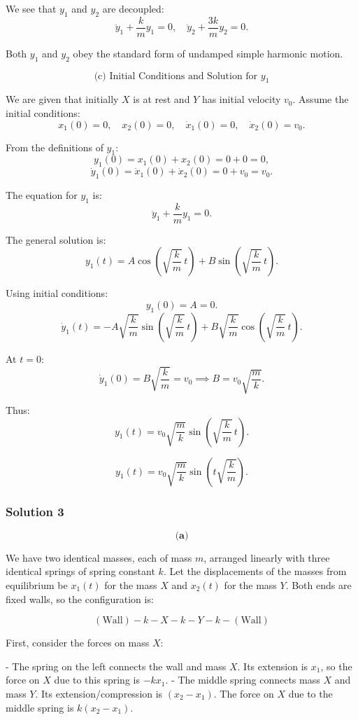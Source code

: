 \documentclass{article}
\begin{document}
We see that $y_1$ and $y_2$ are decoupled:
\[
\ddot{y}_1 + \frac{k}{m}y_1 = 0, \quad \ddot{y}_2 + \frac{3k}{m}y_2 = 0.
\]

Both $y_1$ and $y_2$ obey the standard form of undamped simple harmonic motion.

\[
\text{(c) Initial Conditions and Solution for } y_1
\]

We are given that initially $X$ is at rest and $Y$ has initial velocity $v_0$. Assume the initial conditions:
\[
x_1(0) = 0, \quad x_2(0) = 0, \quad \dot{x}_1(0)=0, \quad \dot{x}_2(0)=v_0.
\]

From the definitions of $y_1$:
\[
y_1(0) = x_1(0) + x_2(0) = 0 + 0 = 0,
\]
\[
\dot{y}_1(0) = \dot{x}_1(0) + \dot{x}_2(0) = 0 + v_0 = v_0.
\]

The equation for $y_1$ is:
\[
\ddot{y}_1 + \frac{k}{m}y_1 = 0.
\]

The general solution is:
\[
y_1(t) = A\cos\left(\sqrt{\frac{k}{m}}\,t\right) + B\sin\left(\sqrt{\frac{k}{m}}\,t\right).
\]

Using initial conditions:
\[
y_1(0) = A = 0.
\]
\[
\dot{y}_1(t) = -A\sqrt{\frac{k}{m}}\sin\left(\sqrt{\frac{k}{m}}\,t\right) + B\sqrt{\frac{k}{m}}\cos\left(\sqrt{\frac{k}{m}}\,t\right).
\]

At $t=0$:
\[
\dot{y}_1(0) = B\sqrt{\frac{k}{m}} = v_0 \implies B = v_0\sqrt{\frac{m}{k}}.
\]

Thus:
\[
y_1(t) = v_0\sqrt{\frac{m}{k}}\sin\left(\sqrt{\frac{k}{m}}\,t\right).
\]

\[
\boxed{y_1(t) = v_0 \sqrt{\frac{m}{k}} \sin\left(t\sqrt{\frac{k}{m}}\right).}
\]

\subsubsection{Solution 3}
\[
\textbf{(a)}
\]

We have two identical masses, each of mass \( m \), arranged linearly with three identical springs of spring constant \( k \). Let the displacements of the masses from equilibrium be \( x_1(t) \) for the mass \( X \) and \( x_2(t) \) for the mass \( Y \). Both ends are fixed walls, so the configuration is:

\[
(\text{Wall}) - k - X - k - Y - k - (\text{Wall})
\]

First, consider the forces on mass \( X \):

- The spring on the left connects the wall and mass \( X \). Its extension is \( x_1 \), so the force on \( X \) due to this spring is \(-k x_1\).
- The middle spring connects mass \( X \) and mass \( Y \). Its extension/compression is \((x_2 - x_1)\). The force on \( X \) due to the middle spring is \(k (x_2 - x_1)\).
\end{document}
